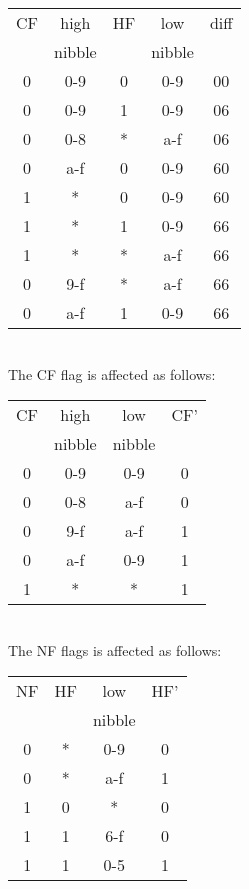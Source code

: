 \documentclass[oneside,a4paper]{book}
\begin{document}
\begin{tabular}{c|c|c|c|c}
CF &  high   & HF & low    & diff \\
   &  nibble &    & nibble &      \\ \hline
 0 & 0-9     &  0 & 0-9    &  00  \\
 0 & 0-9     &  1 & 0-9    &  06  \\
 0 & 0-8     &  * & a-f    &  06  \\
 0 & a-f     &  0 & 0-9    &  60  \\
 1 &  *      &  0 & 0-9    &  60  \\
 1 &  *      &  1 & 0-9    &  66  \\
 1 &  *      &  * & a-f    &  66  \\
 0 & 9-f     &  * & a-f    &  66  \\
 0 & a-f     &  1 & 0-9    &  66  \\ \hline
\end{tabular}
\\[2ex]


The CF flag is affected as follows: \\[2ex]

\begin{tabular}{c|c|c|c}
CF & high   & low    & CF' \\
   & nibble & nibble &     \\ \hline
 0 & 0-9    & 0-9    &  0  \\
 0 & 0-8    & a-f    &  0  \\
 0 & 9-f    & a-f    &  1  \\
 0 & a-f    & 0-9    &  1  \\
 1 &  *     &  *     &  1  \\ \hline
\end{tabular}
\\[2ex]

The NF flags is affected as follows: \\[2ex]
 
\begin{tabular}{c|c|c|c}
NF & HF & low    & HF' \\
   &    & nibble &     \\ \hline
 0 &  * & 0-9    &  0  \\
 0 &  * & a-f    &  1  \\
 1 &  0 &  *     &  0  \\
 1 &  1 & 6-f    &  0  \\
 1 &  1 & 0-5    &  1  \\ \hline
\end{tabular}
\\[2ex]
\end{document}
